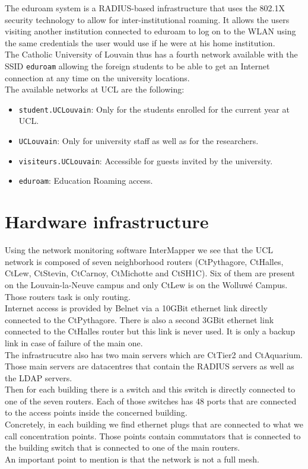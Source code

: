 The eduroam system is a RADIUS-based infrastructure that uses the 802.1X security technology to allow for inter-institutional roaming. It allows the users visiting another institution connected to eduroam to log on to the WLAN using the same credentials the user would use if he were at his home institution\cite{eduroam2}.\\
The Catholic University of Louvain thus has a fourth network available with the SSID \texttt{eduroam} allowing the foreign students to be able to get an Internet connection at any time on the university locations.\\
The available networks at UCL are the following:
\begin{itemize}
	\item \texttt{student.UCLouvain}: Only for the students enrolled for the current year at UCL.
	\item \texttt{UCLouvain}: Only for university staff as well as for the researchers.
	\item \texttt{visiteurs.UCLouvain}: Accessible for guests invited by the university.
	\item \texttt{eduroam}: Education Roaming access.
\end{itemize}



\section{Hardware infrastructure}
Using the network monitoring software InterMapper\cite{intermapper} we see that the UCL network is composed of seven neighborhood routers (CtPythagore, CtHalles, CtLew, CtStevin, CtCarnoy, CtMichotte and CtSH1C). Six of them are present on the Louvain-la-Neuve campus and only CtLew is on the Wolluwé Campus. Those routers task is only routing.\\

Internet access is provided by Belnet via a 10GBit ethernet link directly connected to the CtPythagore. There is also a second 3GBit ethernet link connected to the CtHalles router but this link is never used. It is only a backup link in case of failure of the main one.\\

The infrastrucutre also has two main servers which are CtTier2 and CtAquarium. Those main servers are datacentres that contain the RADIUS servers as well as the LDAP servers.\\

Then for each building there is a switch and this switch is directly connected to one of the seven routers. Each of those switches has 48 ports that are connected to the access points inside the concerned building.\\
Concretely, in each building we find ethernet plugs that are connected to what we call concentration points. Those points contain commutators that is connected to the building switch that is connected to one of the main routers.\\
An important point to mention is that the network is not a full mesh.\\

